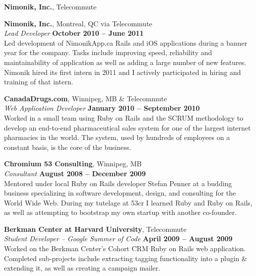 \documentclass[margin,line,letterpaper]{resume}
\begin{document}
\begin{resume}
  {\bf Nimonik, Inc.}, Telecommute \sa

  {\bf Nimonik, Inc.}, Montreal, QC via Telecommute \vspace{2mm}\\\vspace{1mm}%
  {\sl Lead Developer} \hfill {\bf October 2010 -- June 2011}\\
  Led development of NimonikApp.ca Rails and iOS applications during a banner year for the company. Tasks include improving speed, reliability and maintainability of application as well as adding a large number of new features. Nimonik hired its first intern in 2011 and I actively participated in hiring and training of that intern.

  {\bf CanadaDrugs.com}, Winnipeg, MB \& Telecommute \vspace{2mm}\\\vspace{1mm}%
  {\sl Web Application Developer} \hfill {\bf January 2010 -- September 2010}\\
  Worked in a small team using Ruby on Rails and the SCRUM methodology to develop an end-to-end pharmaceutical sales system for one of the largest internet pharmacies in the world. The system, used by hundreds of employees on a constant basis, is the core of the business.

  {\bf Chromium 53 Consulting}, Winnipeg, MB \vspace{2mm}\\\vspace{1mm}%
  {\sl Consultant} \hfill {\bf August 2008 -- December 2009}\\
  Mentored under local Ruby on Rails developer Stefan Penner at a budding business specializing in software development, design, and consulting for the World Wide Web. During my tutelage at 53cr I learned Ruby and Ruby on Rails, as well as attempting to bootstrap my own startup with another co-founder.

  {\bf Berkman Center at Harvard University}, Telecommute \vspace{2mm}\\\vspace{1mm}%
  {\sl Student Developer – Google Summer of Code} \hfill {\bf April 2009 -- August 2009}\\
  Worked on the Berkman Center’s Cohort CRM Ruby on Rails web application. Completed sub-projects include extracting tagging functionality into a plugin \& extending it, as well as creating a campaign mailer.


\end{resume}
\end{document}
